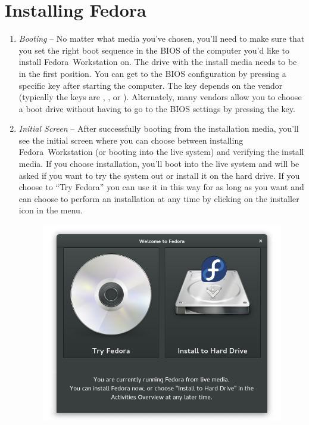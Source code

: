 \section*{Installing Fedora}
\begin{enumerate}
\item\emph{Booting} -- No matter what media you've chosen, you'll need to make sure that you set the right boot sequence in the BIOS of the computer you'd like to install Fedora~Workstation on. The drive with the install media needs to be in the first position. You can get to the BIOS configuration by pressing a specific key after starting the computer. The key depends on the vendor (typically the keys are , , or ). Alternately, many vendors allow you to choose a boot drive without having to go to the BIOS settings by pressing the  key.

\item\emph{Initial Screen} -- After successfully booting from the installation media, you'll see the initial screen where you can choose between installing Fedora~Workstation (or booting into the live system) and verifying the install media. If you choose installation, you'll boot into the live system and will be asked if you want to try the system out or install it on the hard drive. If you choose to \enquote{Try Fedora} you can use it in this way for as long as you want and can choose to perform an installation at any time by clicking on the installer icon in the menu.

\begin{figure}[ht]
\begin{center}
\includegraphics[width=.75\textwidth]{img/instalator-a}
 \label{fig:installer-a}
\end{center}
\end{figure}


\end{enumerate}
